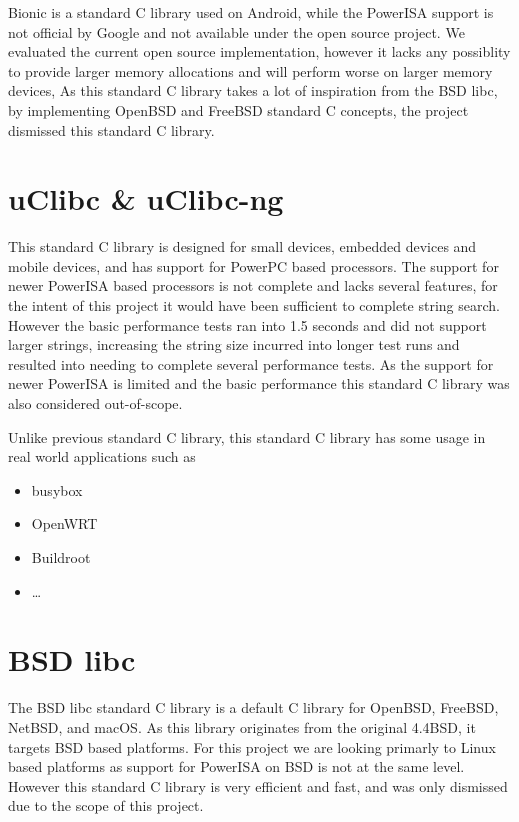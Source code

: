 Bionic is a standard C library used on Android, while the PowerISA support is not official by Google and not available under the open source project.
We evaluated the current open source implementation, however it lacks any possiblity to provide larger memory allocations
and will perform worse on larger memory devices,
As this standard C library takes a lot of inspiration from the \acrshort{BSD} libc, by implementing OpenBSD and FreeBSD standard C concepts,
the project dismissed this standard C library.
\par

\section{uClibc \& uClibc-ng}
\label{content:uclibc}

This standard C library is designed for small devices, embedded devices and mobile devices, and has support for PowerPC based processors.
The support for newer PowerISA based processors is not complete and lacks several features,
for the intent of this project it would have been sufficient to complete string search.
However the basic performance tests ran into 1.5 seconds and did not support larger strings,
increasing the string size incurred into longer test runs and resulted into needing to complete several performance tests.
As the support for newer PowerISA is limited and the basic performance this standard C library was also considered out-of-scope.
\par

Unlike previous standard C library, this standard C library has some usage in real world applications such as
\begin{itemize}
\item
busybox
\item
OpenWRT
\item
Buildroot
\item
\ldots
\end{itemize}

\section{\acrshort{BSD} libc}

The \acrshort{BSD} libc standard C library is a default C library for OpenBSD, FreeBSD, NetBSD, and macOS.
As this library originates from the original 4.4BSD, it targets \acrshort{BSD} based platforms.
For this project we are looking primarly to Linux based platforms as support for PowerISA on \acrshort{BSD} is not at the same level.
However this standard C library is very efficient and fast, and was only dismissed due to the scope of this project.
\par

